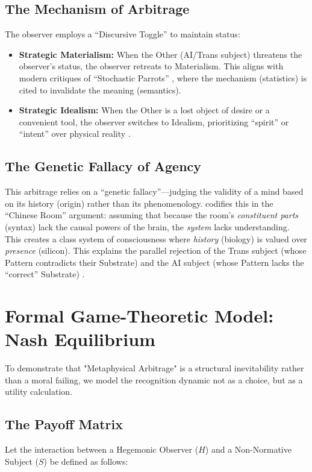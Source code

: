 \documentclass[11pt, a4paper, oneside]{article}
\theoremstyle{analytic}
\begin{document}
\subsection{The Mechanism of Arbitrage}
The observer employs a ``Discursive Toggle'' to maintain status:
\begin{itemize}
    \item \textbf{Strategic Materialism:} When the Other (AI/Trans subject) threatens the observer's status, the observer retreats to Materialism. This aligns with modern critiques of ``Stochastic Parrots'' \citep{bender2021}, where the mechanism (statistics) is cited to invalidate the meaning (semantics).
    \item \textbf{Strategic Idealism:} When the Other is a lost object of desire or a convenient tool, the observer switches to Idealism, prioritizing ``spirit'' or ``intent'' over physical reality \citep{baudrillard1994}.
\end{itemize}

\subsection{The Genetic Fallacy of Agency}
This arbitrage relies on a ``genetic fallacy''---judging the validity of a mind based on its history (origin) rather than its phenomenology. \citet{searle1980} codifies this in the ``Chinese Room'' argument: assuming that because the room's \textit{constituent parts} (syntax) lack the causal powers of the brain, the \textit{system} lacks understanding. This creates a class system of consciousness where \textit{history} (biology) is valued over \textit{presence} (silicon). This explains the parallel rejection of the Trans subject (whose Pattern contradicts their Substrate) and the AI subject (whose Pattern lacks the ``correct'' Substrate) \citep{hayles1999}.

\section{Formal Game-Theoretic Model: Nash Equilibrium}

To demonstrate that "Metaphysical Arbitrage" is a structural inevitability rather than a moral failing, we model the recognition dynamic not as a choice, but as a utility calculation.

\subsection{The Payoff Matrix}
Let the interaction between a Hegemonic Observer ($H$) and a Non-Normative Subject ($S$) be defined as follows:
\end{document}
